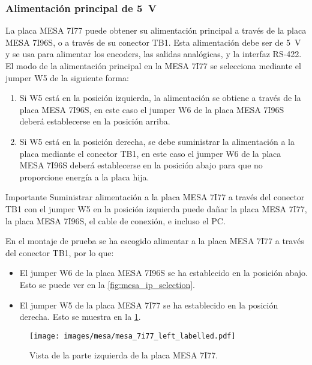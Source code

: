 \documentclass[english,spanish,a4paper,11pt]{article}
\begin{document}
\subsubsection{Alimentación principal de \qty{5}{\V}}
\label{sec:mesa7i77_power}

La placa MESA 7I77 puede obtener su alimentación principal a través de la placa MESA 7I96S, o a través de su conector TB1. Esta alimentación debe ser de \qty{5}{\V} y se usa para alimentar los encoders, las salidas analógicas, y la interfaz RS-422. El modo de la alimentación principal en la MESA 7I77 se selecciona mediante el jumper W5 de la siguiente forma:
%
\begin{enumerate}
    \item Si W5 está en la posición izquierda, la alimentación se obtiene a través de la placa MESA 7I96S, en este caso el jumper W6 de la placa MESA 7I96S deberá establecerse en la posición arriba.

    \item Si W5 está en la posición derecha, se debe suministrar la alimentación a la placa mediante el conector TB1, en este caso el jumper W6 de la placa MESA 7I96S deberá establecerse en la posición abajo para que no proporcione energía a la placa hija.
\end{enumerate}

\begin{admonition}{Importante}
    Suministrar alimentación a la placa MESA 7I77 a través del conector TB1 con el jumper W5 en la posición izquierda puede dañar la placa MESA 7I77, la placa MESA 7I96S, el cable de conexión, e incluso el PC.
\end{admonition}

En el montaje de prueba se ha escogido alimentar a la placa MESA 7I77 a través del conector TB1, por lo que:
\begin{itemize}
    \item El jumper W6 de la placa MESA 7I96S se ha establecido en la posición abajo. Esto se puede ver en la \cref{fig:mesa_ip_selection}.
    
    \item El jumper W5 de la placa MESA 7I77 se ha establecido en la posición derecha. Esto se muestra en la \cref{fig:mesa7i77_left}.
\end{itemize}


\begin{figure}[!ht]
    \centering
    \texttt{[image: images/mesa/mesa\_7i77\_left\_labelled.pdf]}
    \caption{Vista de la parte izquierda de la placa MESA 7I77.}
    \label{fig:mesa7i77_left}
\end{figure}
\end{document}
